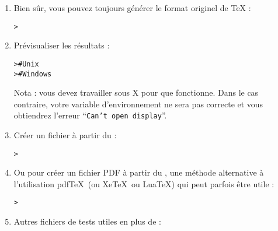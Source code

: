 \documentclass[german, english, french, 12pt]{article}
\renewcommand{\samp}[1]{\enquote{\texttt{#1}}}
\begin{document}
\begin{enumerate}
\item Bien sûr, vous pouvez toujours générer le format originel \dvi{} de
  \TeX{} :
\begin{alltt}
> 
\end{alltt}

\item Prévisualiser les résultats :
\begin{alltt}
>     # Unix
>   # Windows
\end{alltt}
Nota : vous devez travailler sous X pour que  fonctionne.  Dans le
cas contraire, votre variable d'environnement  ne sera pas
correcte et vous obtiendrez l'erreur \samp{Can't open display}.

\item Créer un fichier \PS{} à partir du \dvi{} :
\begin{alltt}
> 
\end{alltt}

\item Ou pour créer un fichier PDF à partir du \dvi{}, une méthode alternative
  à l'utilisation pdf\TeX\ (ou Xe\TeX\ ou Lua\TeX) qui peut parfois être utile :
\begin{alltt}
> 
\end{alltt}

\item Autres fichiers de tests utiles en plus de  :



\end{enumerate}
\end{document}
